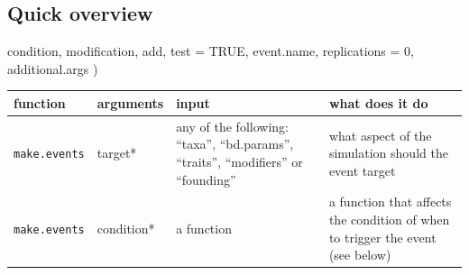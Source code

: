 \documentclass[
]{book}
\begin{document}
\hypertarget{quick-overview-2}{%
\subsection{Quick overview}\label{quick-overview-2}}

condition,
modification,
add,
test = TRUE,
event.name,
replications = 0,
additional.args
)

\begin{longtable}[]{@{}llll@{}}
\toprule
\begin{minipage}[b]{0.19\columnwidth}\raggedright
function\strut
\end{minipage} & \begin{minipage}[b]{0.23\columnwidth}\raggedright
arguments\strut
\end{minipage} & \begin{minipage}[b]{0.14\columnwidth}\raggedright
input\strut
\end{minipage} & \begin{minipage}[b]{0.33\columnwidth}\raggedright
what does it do\strut
\end{minipage}\tabularnewline
\midrule
\endhead
\begin{minipage}[t]{0.19\columnwidth}\raggedright
\texttt{make.events}\strut
\end{minipage} & \begin{minipage}[t]{0.23\columnwidth}\raggedright
target*\strut
\end{minipage} & \begin{minipage}[t]{0.14\columnwidth}\raggedright
any of the following: ``taxa'', ``bd.params'', ``traits'', ``modifiers'' or ``founding''\strut
\end{minipage} & \begin{minipage}[t]{0.33\columnwidth}\raggedright
what aspect of the simulation should the event target\strut
\end{minipage}\tabularnewline
\begin{minipage}[t]{0.19\columnwidth}\raggedright
\texttt{make.events}\strut
\end{minipage} & \begin{minipage}[t]{0.23\columnwidth}\raggedright
condition*\strut
\end{minipage} & \begin{minipage}[t]{0.14\columnwidth}\raggedright
a function\strut
\end{minipage} & \begin{minipage}[t]{0.33\columnwidth}\raggedright
a function that affects the condition of when to trigger the event (see below)\strut

\end{minipage}
\end{longtable}
\end{document}
